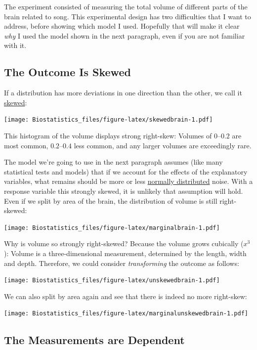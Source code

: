 \documentclass[
]{book}
\begin{document}
The experiment consisted of measuring the total volume of different parts of the brain related to song. This experimental design has two difficulties that I want to address, before showing which model I used. Hopefully that will make it clear \emph{why} I used the model shown in the next paragraph, even if you are not familiar with it.

\hypertarget{braintransform}{%
\subsection{The Outcome Is Skewed}\label{braintransform}}

If a distribution has more deviations in one direction than the other, we call it \href{https://en.wikipedia.org/wiki/Skewness}{skewed}:

\texttt{[image: Biostatistics\_files/figure-latex/skewedbrain-1.pdf]}

This histogram of the volume displays strong right-skew: Volumes of \(0\)--\(0.2\) are most common, \(0.2\)--\(0.4\) less common, and any larger volumes are exceedingly rare.

The model we're going to use in the next paragraph assumes (like many statistical tests and models) that if we account for the effects of the explanatory variables, what remains should be more or less \href{https://www.mathsisfun.com/data/standard-normal-distribution.html}{normally distributed} noise. With a response variable this strongly skewed, it is unlikely that assumption will hold. Even if we split by area of the brain, the distribution of volume is still right-skewed:

\texttt{[image: Biostatistics\_files/figure-latex/marginalbrain-1.pdf]}

Why is volume so strongly right-skewed? Because the volume grows cubically (\(x^3\)): Volume is a three-dimensional measurement, determined by the length, width and depth. Therefore, we could consider \emph{transforming} the outcome as follows:

\texttt{[image: Biostatistics\_files/figure-latex/unskewedbrain-1.pdf]}

We can also split by area again and see that there is indeed no more right-skew:

\texttt{[image: Biostatistics\_files/figure-latex/marginalunskewedbrain-1.pdf]}

\hypertarget{braindependence}{%
\subsection{The Measurements are Dependent}\label{braindependence}}
\end{document}
